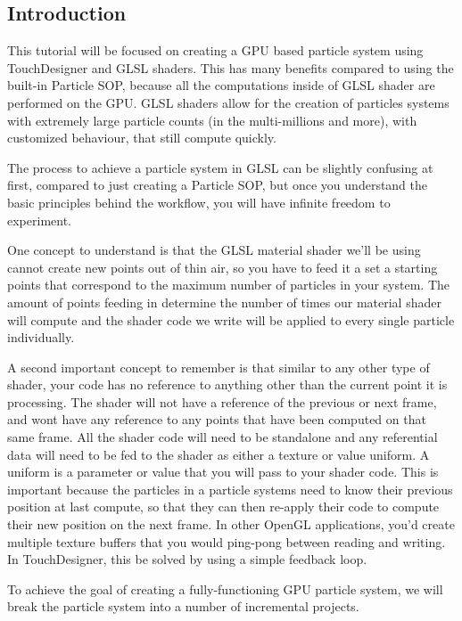 \subsection{Introduction}
\begin{fullwidth}
This tutorial will be focused on creating a GPU based particle system using TouchDesigner and GLSL shaders. This has many benefits compared to using the built-in Particle SOP, because all the computations inside of GLSL shader are performed on the GPU. GLSL shaders allow for the creation of particles systems with extremely large particle counts (in the multi-millions and more), with customized behaviour, that still compute quickly.

The process to achieve a particle system in GLSL can be slightly confusing at first, compared to just creating a Particle SOP, but once you understand the basic principles behind the workflow, you will have infinite freedom to experiment.

One concept to understand is that the GLSL material shader we'll be using cannot create new points out of thin air, so you have to feed it a set a starting points that correspond to the maximum number of particles in your system. The amount of points feeding in determine the number of times our material shader will compute and the shader code we write will be applied to every single particle individually.

A second important concept to remember is that similar to any other type of shader, your code has no reference to anything other than the current point it is processing. The shader will not have a reference of the previous or next frame, and wont have any reference to any points that have been computed on that same frame. All the shader code will need to be standalone and any referential data will need to be fed to the shader as either a texture or value uniform. A uniform is a parameter or value that you will pass to your shader code. This is important because the particles in a particle systems need to know their previous position at last compute, so that they can then re-apply their code to compute their new position on the next frame. In other OpenGL applications, you'd create multiple texture buffers that you would ping-pong between reading and writing. In TouchDesigner, this be solved by using a simple feedback loop.

To achieve the goal of creating a fully-functioning GPU particle system, we will break the particle system into a number of incremental projects.

\end{fullwidth}

